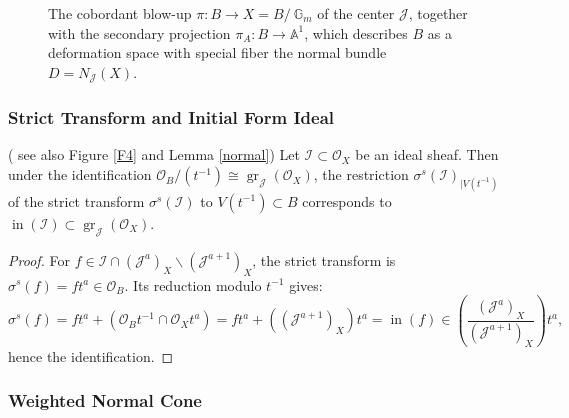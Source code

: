\documentclass{amsart}
\newcommand{\bbA}{{\mathbb{A}}}
\newcommand{\cI}{{\mathcal I}}
\newcommand{\cJ}{{\mathcal J}}
\newcommand{\cO}{{\mathcal O}}
\newcommand{\inn}{\operatorname{in}}
\renewcommand{\setminus}{\smallsetminus}
\newcommand{\gr}{{\operatorname{gr}}}
\begin{document}
\begin{figure}[h]


\caption{The cobordant blow-up $\pi: B \to X = B /\ \mathbb{G}_m$ of the center $\mathcal{J}$, together with the secondary projection $\pi_A: B \to \mathbb{A}^1$, which describes $B$ as a deformation space with special fiber the normal bundle $D = N_{\mathcal{J}}(X)$.}
\label{F3}

\end{figure}
\subsubsection{Strict Transform and Initial Form Ideal}

\begin{lemma}\label{grad2}( see also Figure \ref{F4} and Lemma \ref{normal})
Let \( \cI \subset \cO_X \) be an ideal sheaf. Then under the identification \( \cO_B/(t^{-1}) \cong \gr_{\cJ}(\cO_X) \), the restriction \( \sigma^s(\cI)_{|V(t^{-1})} \) of the strict transform \( \sigma^s(\cI) \) to \( V(t^{-1}) \subset B \) corresponds to \( \inn(\cI) \subset \gr_{\cJ}(\cO_X) \).
\end{lemma}

\begin{proof}
For \( f \in \cI \cap (\cJ^a)_X \setminus (\cJ^{a+1})_X \), the strict transform is \( \sigma^s(f) =  ft^a \in \cO_B \). Its reduction modulo \( t^{-1} \) gives:
\[
\sigma^s(f)=ft^a +(\cO_Bt^{-1}\cap \cO_Xt^a)=ft^a+((\cJ^{a+1})_X)t^a=\inn(f) \in \left( \frac{(\cJ^a)_X}{(\cJ^{a+1})_X} \right) t^a ,
\]
hence the identification.
\end{proof}

\subsubsection{Weighted Normal Cone}
\end{document}
